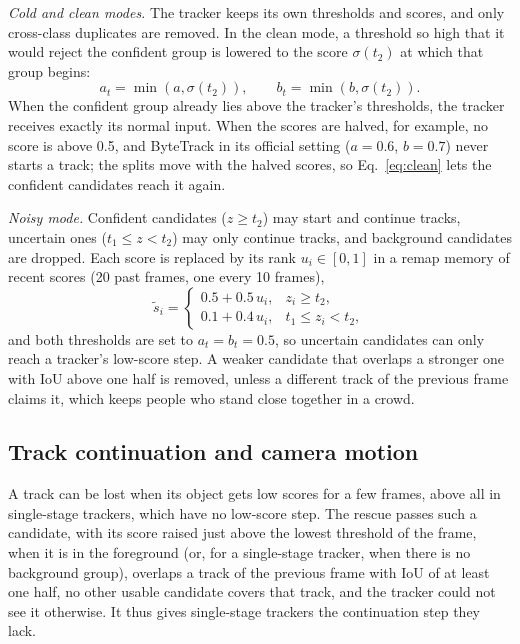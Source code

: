 \documentclass[pdflatex,sn-mathphys-num,iicol]{sn-jnl}
\begin{document}
\emph{Cold and clean modes.} The tracker keeps its own thresholds and scores, and only cross-class
duplicates are removed. In the clean mode, a threshold so high that it would reject the confident
group is lowered to the score $\sigma(t_2)$ at which that group begins:
\begin{equation}
a_t=\min\!\left(a,\sigma(t_2)\right),\qquad b_t=\min\!\left(b,\sigma(t_2)\right).
\label{eq:clean}
\end{equation}
When the confident group already lies above the tracker's thresholds, the tracker receives exactly
its normal input. When the scores are halved, for example, no score is above 0.5, and ByteTrack in
its official setting ($a=0.6$, $b=0.7$) never starts a track; the splits move with the halved
scores, so Eq.~\eqref{eq:clean} lets the confident candidates reach it again.

\emph{Noisy mode.} Confident candidates ($z\ge t_2$) may start and continue tracks, uncertain ones
($t_1\le z<t_2$) may only continue tracks, and background candidates are dropped. Each score is
replaced by its rank $u_i\in[0,1]$ in a remap memory of recent scores (20 past frames, one every 10
frames),
\begin{equation}
\tilde{s}_i=
\begin{cases}
0.5+0.5\,u_i, & z_i\ge t_2,\\
0.1+0.4\,u_i, & t_1\le z_i<t_2,
\end{cases}
\label{eq:remap}
\end{equation}
and both thresholds are set to $a_t=b_t=0.5$, so uncertain candidates can only reach a tracker's
low-score step. A weaker candidate that overlaps a stronger one with IoU above one half is removed,
unless a different track of the previous frame claims it, which keeps people who stand close
together in a crowd.

\subsection{Track continuation and camera motion}\label{sec:rescue}
A track can be lost when its object gets low scores for a few frames, above all in single-stage
trackers, which have no low-score step. The rescue passes such a candidate, with its score raised
just above the lowest threshold of the frame, when it is in the foreground (or, for a
single-stage tracker, when there is no background group), overlaps a track of the previous frame
with IoU of at least one half, no other usable candidate covers that track, and the tracker could
not see it otherwise. It thus gives single-stage trackers the continuation step they lack.
\end{document}
